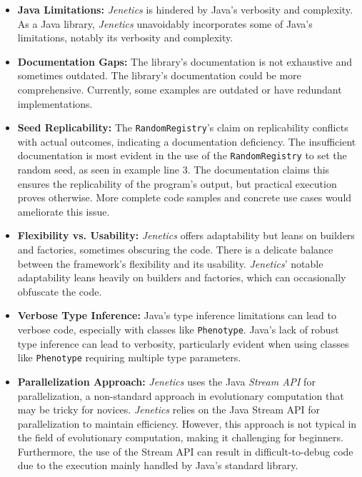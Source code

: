   \begin{itemize}
    \item \textbf{Java Limitations:} \textit{Jenetics} is hindered by Java's 
      verbosity and complexity.
      As a Java library, \textit{Jenetics} unavoidably incorporates some of 
      Java's limitations, notably its verbosity and complexity.
    \item \textbf{Documentation Gaps:} The library's documentation is not 
      exhaustive and sometimes outdated.
      The library's documentation could be more comprehensive. Currently, some 
      examples are outdated or have redundant implementations.
    \item \textbf{Seed Replicability:} The \texttt{RandomRegistry}'s claim on 
      replicability conflicts with actual outcomes, indicating a documentation 
      deficiency.
      The insufficient documentation is most evident in the use of the 
      \texttt{RandomRegistry} to set the random seed, as seen in example line 
      3.
      The documentation claims this ensures the replicability of the program's 
      output, but practical execution proves otherwise.
      More complete code samples and concrete use cases would ameliorate this 
      issue.
    \item \textbf{Flexibility vs. Usability:} \textit{Jenetics} offers 
      adaptability but leans on builders and factories, sometimes obscuring the 
      code.
      There is a delicate balance between the framework's flexibility and its 
      usability. \textit{Jenetics}' notable adaptability leans heavily on 
      builders and factories, which can occasionally obfuscate the code.
    \item \textbf{Verbose Type Inference:} Java's type inference limitations 
      can lead to verbose code, especially with classes like \texttt{Phenotype}.
      Java's lack of robust type inference can lead to verbosity, particularly 
      evident when using classes like \texttt{Phenotype} requiring multiple 
      type parameters.
    \item \textbf{Parallelization Approach:} \textit{Jenetics} uses the Java 
      \textit{Stream API} for parallelization, a non-standard approach in 
      evolutionary computation that may be tricky for novices.
      \textit{Jenetics} relies on the Java Stream API for parallelization to 
      maintain efficiency. However, this approach is not typical in the field 
      of evolutionary computation, making it challenging for beginners. 
      Furthermore, the use of the Stream API can result in difficult-to-debug 
      code due to the execution mainly handled by Java's standard library.
    

\end{itemize}
